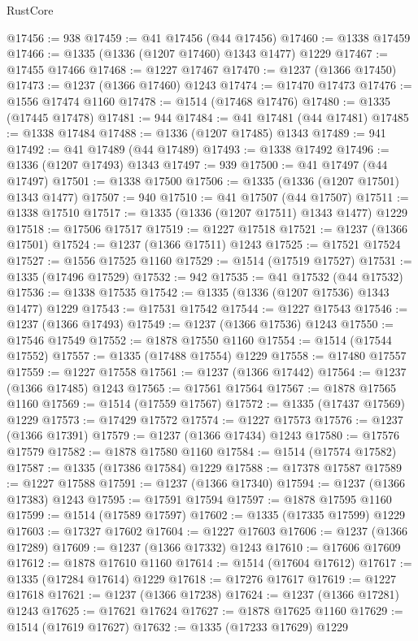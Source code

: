 \begin{lexlean}{RustCore}
\begin{coremodule}
@17456 := 938
@17459 := @41 @17456 (@44 @17456)
@17460 := @1338 @17459
@17466 := @1335 (@1336 (@1207 @17460) @1343 @1477) @1229
@17467 := @17455 @17466
@17468 := @1227 @17467
@17470 := @1237 (@1366 @17450)
@17473 := @1237 (@1366 @17460) @1243
@17474 := @17470 @17473
@17476 := @1556 @17474 @1160
@17478 := @1514 (@17468 @17476)
@17480 := @1335 (@17445 @17478)
@17481 := 944
@17484 := @41 @17481 (@44 @17481)
@17485 := @1338 @17484
@17488 := @1336 (@1207 @17485) @1343
@17489 := 941
@17492 := @41 @17489 (@44 @17489)
@17493 := @1338 @17492
@17496 := @1336 (@1207 @17493) @1343
@17497 := 939
@17500 := @41 @17497 (@44 @17497)
@17501 := @1338 @17500
@17506 := @1335 (@1336 (@1207 @17501) @1343 @1477)
@17507 := 940
@17510 := @41 @17507 (@44 @17507)
@17511 := @1338 @17510
@17517 := @1335 (@1336 (@1207 @17511) @1343 @1477) @1229
@17518 := @17506 @17517
@17519 := @1227 @17518
@17521 := @1237 (@1366 @17501)
@17524 := @1237 (@1366 @17511) @1243
@17525 := @17521 @17524
@17527 := @1556 @17525 @1160
@17529 := @1514 (@17519 @17527)
@17531 := @1335 (@17496 @17529)
@17532 := 942
@17535 := @41 @17532 (@44 @17532)
@17536 := @1338 @17535
@17542 := @1335 (@1336 (@1207 @17536) @1343 @1477) @1229
@17543 := @17531 @17542
@17544 := @1227 @17543
@17546 := @1237 (@1366 @17493)
@17549 := @1237 (@1366 @17536) @1243
@17550 := @17546 @17549
@17552 := @1878 @17550 @1160
@17554 := @1514 (@17544 @17552)
@17557 := @1335 (@17488 @17554) @1229
@17558 := @17480 @17557
@17559 := @1227 @17558
@17561 := @1237 (@1366 @17442)
@17564 := @1237 (@1366 @17485) @1243
@17565 := @17561 @17564
@17567 := @1878 @17565 @1160
@17569 := @1514 (@17559 @17567)
@17572 := @1335 (@17437 @17569) @1229
@17573 := @17429 @17572
@17574 := @1227 @17573
@17576 := @1237 (@1366 @17391)
@17579 := @1237 (@1366 @17434) @1243
@17580 := @17576 @17579
@17582 := @1878 @17580 @1160
@17584 := @1514 (@17574 @17582)
@17587 := @1335 (@17386 @17584) @1229
@17588 := @17378 @17587
@17589 := @1227 @17588
@17591 := @1237 (@1366 @17340)
@17594 := @1237 (@1366 @17383) @1243
@17595 := @17591 @17594
@17597 := @1878 @17595 @1160
@17599 := @1514 (@17589 @17597)
@17602 := @1335 (@17335 @17599) @1229
@17603 := @17327 @17602
@17604 := @1227 @17603
@17606 := @1237 (@1366 @17289)
@17609 := @1237 (@1366 @17332) @1243
@17610 := @17606 @17609
@17612 := @1878 @17610 @1160
@17614 := @1514 (@17604 @17612)
@17617 := @1335 (@17284 @17614) @1229
@17618 := @17276 @17617
@17619 := @1227 @17618
@17621 := @1237 (@1366 @17238)
@17624 := @1237 (@1366 @17281) @1243
@17625 := @17621 @17624
@17627 := @1878 @17625 @1160
@17629 := @1514 (@17619 @17627)
@17632 := @1335 (@17233 @17629) @1229

\end{coremodule}
\end{lexlean}
